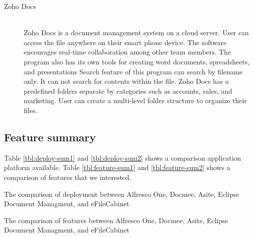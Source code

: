 \begin{description}
\item[Zoho Docs] \hfill \\
Zoho Docs is a document management system on a cloud server.
User can access the file anywhere on their smart phone device.
The software encourages real-time collaboration among other team members.
The program also has its own tools for creating word documents, spreadsheets, and presentations
Search feature of this program can search by filename only.
It can not search for contents within the file.
Zoho Docs has a predefined folders separate by categories such as accounts, sales, and marketing.
User can create a multi-level folder structure to organize their files.
\end{description}

\newpage

\subsection{Feature summary}
Table \ref{tbl:deploy-sum1} and \ref{tbl:deploy-sum2} shows a comparison application platform available.
Table \ref{tbl:feature-sum1} and \ref{tbl:feature-sum2} shows a comparison of features that we interested.

\begin{table}[h]
    
    \caption{The comparison of deployment between Alfresco One, Docmee, Asite, Eclipse Document Managment, and eFileCabinet}
    \label{tbl:deploy-sum1}
\end{table}

\vspace{1.5cm}

\begin{table}[h]
    
    \caption{The comparison of features between Alfresco One, Docmee, Asite, Eclipse Document Managment, and eFileCabinet}
    \label{tbl:feature-sum1}
\end{table}

